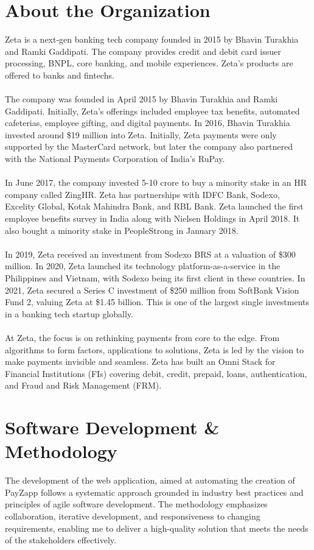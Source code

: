 \documentclass[12pt,a4paper]{report}
\begin{document}
\section{About the Organization}
Zeta is a next-gen banking tech company founded in 2015 by Bhavin Turakhia and Ramki Gaddipati. The company provides credit and debit card issuer processing, BNPL, core banking, and mobile experiences. Zeta's products are offered to banks and fintechs.
\\\\
\noindent The company was founded in April 2015 by Bhavin Turakhia and Ramki Gaddipati. Initially, Zeta's offerings included employee tax benefits, automated cafeterias, employee gifting, and digital payments. In 2016, Bhavin Turakhia invested around \$19 million into Zeta. Initially, Zeta payments were only supported by the MasterCard network, but later the company also partnered with the National Payments Corporation of India's RuPay.
\\\\
\noindent In June 2017, the company invested 5-10 crore to buy a minority stake in an HR company called ZingHR. Zeta has partnerships with IDFC Bank, Sodexo, Excelity Global, Kotak Mahindra Bank, and RBL Bank. Zeta launched the first employee benefits survey in India along with Nielsen Holdings in April 2018. It also bought a minority stake in PeopleStrong in January 2018.
\\\\
\noindent In 2019, Zeta received an investment from Sodexo BRS at a valuation of \$300 million. In 2020, Zeta launched its technology platform-as-a-service in the Philippines and Vietnam, with Sodexo being its first client in these countries. In 2021, Zeta secured a Series C investment of \$250 million from SoftBank Vision Fund 2, valuing Zeta at \$1.45 billion. This is one of the largest single investments in a banking tech startup globally.
\\\\
\noindent At Zeta, the focus is on rethinking payments from core to the edge. From algorithms to form factors, applications to solutions, Zeta is led by the vision to make payments invisible and seamless. Zeta has built an Omni Stack for Financial Institutions (FIs) covering debit, credit, prepaid, loans, authentication, and Fraud and Risk Management (FRM).




\section{Software Development & Methodology}
\noindent The development of the web application, aimed at automating the creation of PayZapp follows a systematic approach grounded in industry best practices and principles of agile software development. The methodology emphasizes collaboration, iterative development, and responsiveness to changing requirements, enabling me to deliver a high-quality solution that meets the needs of the stakeholders effectively.
\end{document}
